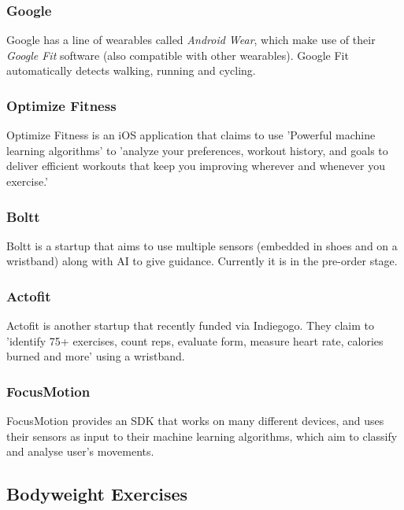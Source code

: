 \documentclass[a4paper]{article}
\begin{document}
\subsubsection{Google}

Google has a line of wearables called \textit{Android Wear}\cite{bgref9}, which make use of their \textit{Google Fit}\cite{bgref10} software (also compatible with other wearables).
Google Fit automatically detects walking, running and cycling.

\subsubsection{Optimize Fitness}

Optimize Fitness\cite{bgref11} is an iOS application that claims to use 'Powerful machine learning algorithms' to 'analyze your preferences, workout history, and goals to deliver efficient workouts that keep you improving wherever and whenever you exercise.'

\subsubsection{Boltt}

Boltt\cite{bgref12} is a startup that aims to use multiple sensors (embedded in shoes and on a wristband) along with AI to give guidance. Currently it is in the pre-order stage.

\subsubsection{Actofit}

Actofit\cite{bgref13} is another startup that recently funded via Indiegogo\cite{bgref14}. They claim to 'identify 75+ exercises, count reps, evaluate form, measure heart rate, calories burned and more' using a wristband.

\subsubsection{FocusMotion}

FocusMotion\cite{bgref15} provides an SDK that works on many different devices, and uses their sensors as input to their machine learning algorithms, which aim to classify and analyse user's movements.

\subsection{Bodyweight Exercises}%
\end{document}
